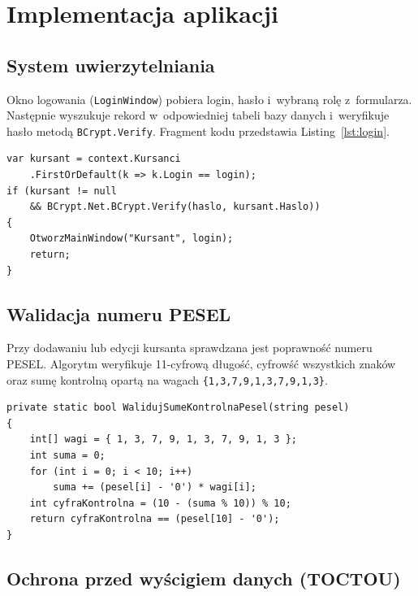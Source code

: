 \chapter{Implementacja aplikacji}
\label{ch:implementacja}

\section{System uwierzytelniania}

Okno logowania (\texttt{LoginWindow}) pobiera login, has\l{}o i~wybran\k{a} rol\k{e}
z~formularza. Nast\k{e}pnie wyszukuje rekord w~odpowiedniej tabeli bazy danych
i~weryfikuje has\l{}o metod\k{a} \texttt{BCrypt.Verify}. Fragment kodu
przedstawia Listing~\ref{lst:login}.

\begin{lstlisting}[language={[Sharp]C}, caption={Weryfikacja has\l{}a bcrypt podczas logowania}, label=lst:login]
var kursant = context.Kursanci
    .FirstOrDefault(k => k.Login == login);
if (kursant != null
    && BCrypt.Net.BCrypt.Verify(haslo, kursant.Haslo))
{
    OtworzMainWindow("Kursant", login);
    return;
}
\end{lstlisting}

\section{Walidacja numeru PESEL}

Przy dodawaniu lub edycji kursanta sprawdzana jest poprawno\'{s}\'{c} numeru PESEL.
Algorytm weryfikuje 11-cyfrow\k{a} d\l{}ugo\'{s}\'{c}, cyfrow\'{s}\'{c} wszystkich znak\'{o}w
oraz sum\k{e} kontroln\k{a} opart\k{a} na wagach \texttt{\{1,3,7,9,1,3,7,9,1,3\}}.

\begin{lstlisting}[language={[Sharp]C}, caption={Algorytm weryfikacji sumy kontrolnej PESEL}, label=lst:pesel]
private static bool WalidujSumeKontrolnaPesel(string pesel)
{
    int[] wagi = { 1, 3, 7, 9, 1, 3, 7, 9, 1, 3 };
    int suma = 0;
    for (int i = 0; i < 10; i++)
        suma += (pesel[i] - '0') * wagi[i];
    int cyfraKontrolna = (10 - (suma % 10)) % 10;
    return cyfraKontrolna == (pesel[10] - '0');
}
\end{lstlisting}

\section{Ochrona przed wy\'{s}cigiem danych (TOCTOU)}

